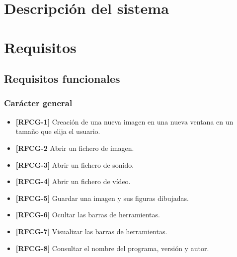 \pagestyle{empty}
\maketitle
\vskip1cm
\clearpage
\tableofcontents
\clearpage
\setcounter{page}{1}
\pagestyle{plain}
\section{Descripción del sistema}
\section{Requisitos}
\subsection{Requisitos funcionales}
\subsubsection{Carácter general}
\begin{itemize}
\item{\textbf{[RFCG-1]} Creación de una nueva imagen en una nueva ventana en un tamaño que elija el usuario.}
\item{\textbf{[RFCG-2} Abrir un fichero de imagen.}
\item{\textbf{[RFCG-3]} Abrir un fichero de sonido.}
\item{\textbf{[RFCG-4]} Abrir un fichero de vídeo.}
\item{\textbf{[RFCG-5]} Guardar una imagen y sus figuras dibujadas.}
\item{\textbf{[RFCG-6]} Ocultar las barras de herramientas.}
\item{\textbf{[RFCG-7]} Visualizar las barras de herramientas.}
\item{\textbf{[RFCG-8]} Consultar el nombre del programa, versión y autor.}
\end{itemize}
